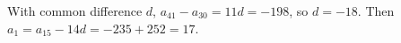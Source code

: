 With common difference $d$, $a_{41}-a_{30}=11d=-198$, so $d=-18$. Then $a_1=a_{15}-14d=-235+252=\boxed{17}$.
